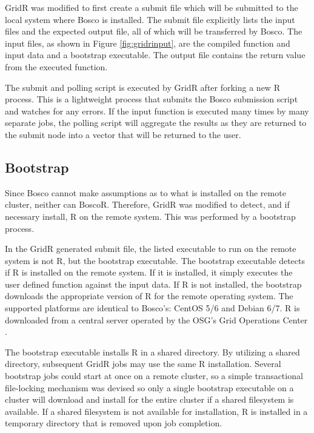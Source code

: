 GridR was modified to first create a submit file which will be submitted to the local system where Bosco is installed.  The submit file explicitly lists the input files and the expected output file, all of which will be transferred by Bosco.  The input files, as shown in Figure \ref{fig:gridrinput}, are the compiled function and input data and a bootstrap executable.  The output file contains the return value from the executed function.

The submit and polling script is executed by GridR after forking a new R process.  This is a lightweight process that submits the Bosco submission script and watches for any errors.  If the input function is executed many times by many separate jobs, the polling script will aggregate the results as they are returned to the submit node into a vector that will be returned to the user.  

\subsection{Bootstrap}
\label{sec:boscorbootstrap}

Since Bosco cannot make assumptions as to what is installed on the remote cluster, neither can BoscoR.  Therefore, GridR was modified to detect, and if necessary install, R on the remote system.  This was performed by a bootstrap process.

In the GridR generated submit file, the listed executable to run on the remote system is not R, but the bootstrap executable.  The bootstrap executable detects if R is installed on the remote system.  If it is installed, it simply executes the user defined function against the input data.  If R is not installed, the bootstrap downloads the appropriate version of R for the remote operating system.  The supported platforms are identical to Bosco's: CentOS 5/6 and Debian 6/7.  R is downloaded from a central server operated by the OSG's Grid Operations Center \cite{osgoperations}.  

The bootstrap executable installs R in a shared directory.  By utilizing a shared directory, subsequent GridR jobs may use the same R installation.  Several bootstrap jobs could start at once on a remote cluster, so a simple transactional file-locking mechanism was devised so only a single bootstrap executable on a cluster will download and install for the entire cluster if a shared filesystem is available.  If a shared filesystem is not available for installation, R is installed in a temporary directory that is removed upon job completion.

